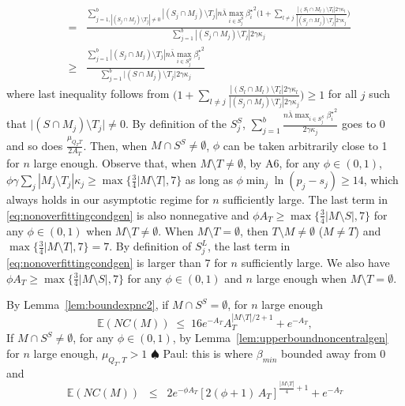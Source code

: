 \documentclass[aos]{imsart}
\theoremstyle{plain}
\newcommand{\paul}[1]{{\small{\color{green} \sf $\spadesuit$ Paul: #1}}}
\newcommand{\E}{\mathbb{E}}
\begin{document}
\begin{supplement}
\begin{eqnarray*}
    &=& \frac{\sum_{j=1,|(S_j\cap M_j )\setminus T_j|\neq 0 }^b|(S_j\cap M_j )\setminus T_j|n\bar{\lambda}\max_{i\in S^S_j}{\beta_i^{\star}}^2\Big(1+\sum_{l\neq j}\frac{|(S_l\cap M_l)\setminus T_l|2\gamma\kappa_l}{|(S_j\cap M_j )\setminus T_j|2\gamma\kappa_j}\Big)}{\sum_{j=1}^b|(S_j\cap M_j )\setminus T_j|2\gamma\kappa_j} \\
    &\geq & \frac{\sum_{j=1}^b|(S_j\cap M_j )\setminus T_j|n\bar{\lambda}\max_{i\in S^S_j}{\beta_i^{\star}}^2}{\sum_{j=1}^b \big|(S\cap M_j)\setminus T_j\big|2\gamma\kappa_j} 
\end{eqnarray*}
where last inequality follows from $\Big(1+\sum_{l\neq j}\frac{|(S_l\cap M_l)\setminus T_l|2\gamma\kappa_l}{|(S_j\cap M_j )\setminus T_j|2\gamma\kappa_j}\Big)\geq 1$ for all $j$ such that $|(S\cap M_j)\setminus T_j\big|\neq 0$. By definition of the $S_j^S$, $\sum_{j=1}^b\frac{n\bar{\lambda}\max_{i\in S^S_j}{\beta_i^{\star}}^2}{2\gamma\kappa_j}$ goes to 0 and so does $\frac{\mu_{Q_T T}}{2A_T}$. Then, when $M\cap S^S\neq\emptyset$, $\phi$ can be taken arbitrarily close to 1 for $n$ large enough. Observe that, when $M\setminus T\neq \emptyset$, by A6, for any $\phi\in(0,1)$, $\phi\gamma\sum_{j}|M_j\setminus T_j|\kappa_j\geq \max\{\tfrac{3}{4}|M\setminus T|,7\}$ as long as $\phi\min_j \ln(p_j-s_j)\geq 14$, which always holds in our asymptotic regime for $n$ sufficiently large. The last term in \eqref{eq:nonoverfittingcondgen} is also nonnegative and $\phi A_T\geq \max\{\tfrac{3}{4}|M\setminus S|,7\}$ for any $\phi\in(0,1)$ when $M\setminus T\neq \emptyset$. When $M\setminus T= \emptyset$, then $T\setminus M \neq \emptyset$ ($M\neq T$) and $\max\{\tfrac{3}{4}|M\setminus T|,7\}=7$. By definition of $S^L_j$, the last term in \eqref{eq:nonoverfittingcondgen} is larger than $7$ for $n$ sufficiently large. We also have $\phi A_T\geq \max\{\tfrac{3}{4}|M\setminus S|,7\}$ for any $\phi\in(0,1)$ and $n$ large enough when $M\setminus T = \emptyset$.

By Lemma~\ref{lem:boundexpnc2}, if $M\cap S^S=\emptyset$, for $n$ large enough
$$
\E(NC(M))\;\leq\;16 e^{-A_T}A_T^{|M\setminus T|/2+1}+e^{-A_T},
$$
If $M\cap S^S\neq\emptyset$, for any $\phi\in(0,1)$, by Lemma~\ref{lem:upperboundnoncentralgen} for $n$ large enough, $\mu_{Q_T,T}>1$ \paul{this is where $\beta_{min}$ bounded away from 0} and
$$\E\left(NC(M)\right)  \;\;\leq\;\;  2e^{-\phi A_T}[2(\phi+1)\,A_T]^{\frac{|M\setminus T|}{4}+1}+ e^{-A_T}$$



\end{supplement}
\end{document}
